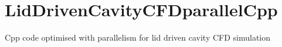 \chapter{Lid\+Driven\+Cavity\+CFDparallel\+Cpp}
\hypertarget{md_README}{}\label{md_README}
\label{md_README_autotoc_md0}%
%
Cpp code optimised with parallelism for lid driven cavity CFD simulation 